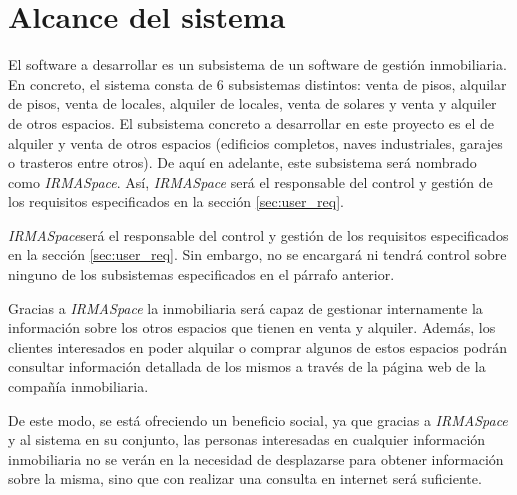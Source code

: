 \chapter{Alcance del sistema}\label{sec:scope}
\par El software a desarrollar es un subsistema de un software de gestión inmobiliaria. En concreto, el sistema consta de 6 subsistemas distintos: venta de pisos, alquilar de pisos, venta de locales, alquiler de locales, venta de solares y venta y alquiler de otros espacios. El subsistema concreto a desarrollar en este proyecto es el de alquiler y venta de otros espacios (edificios completos, naves industriales, garajes o trasteros entre otros). De aquí en adelante, este subsistema será nombrado como \textit{IRMASpace}. Así, \textit{IRMASpace} será el responsable del control y gestión de los requisitos especificados en la sección \ref{sec:user_req}.

\par \textit{IRMASpace}será el responsable del control y gestión de los requisitos especificados en la sección \ref{sec:user_req}. Sin embargo, no se encargará ni tendrá control sobre ninguno de los subsistemas especificados en el párrafo anterior.

\par Gracias a \textit{IRMASpace} la inmobiliaria será capaz de gestionar internamente la información sobre los otros espacios que tienen en venta y alquiler. Además, los clientes interesados en poder alquilar o comprar algunos de estos espacios podrán consultar información detallada de los mismos a través de la página web de la compañía inmobiliaria.

\par De este modo, se está ofreciendo un beneficio social, ya que gracias a \textit{IRMASpace} y al sistema en su conjunto, las personas interesadas en cualquier información inmobiliaria no se verán en la necesidad de desplazarse para obtener información sobre la misma, sino que con realizar una consulta en internet será suficiente.

